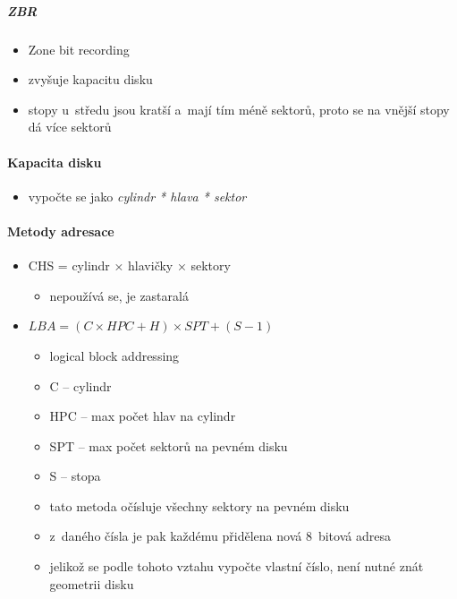 \documentclass[a4paper,12pt]{article}
\providecommand{\tightlist}{%
\setlength{\itemsep}{0pt}\setlength{\parskip}{0pt}}
\begin{document}
\subparagraph{ZBR}

\begin{itemize}
\tightlist
\item Zone bit recording
\item zvyšuje kapacitu disku
\item stopy u~středu jsou kratší a~mají tím méně sektorů, proto se na vnější
  stopy dá více sektorů
\end{itemize}

\paragraph{Kapacita disku}

\begin{itemize}
\tightlist
\item vypočte se jako \emph{cylindr * hlava * sektor}
\end{itemize}

\paragraph{Metody adresace}

\begin{itemize}
\tightlist
\item CHS = cylindr × hlavičky × sektory

  \begin{itemize}
  \tightlist
  \item nepoužívá se, je zastaralá
  \end{itemize}
\item $LBA = (C \times HPC + H) \times SPT + (S - 1)$

  \begin{itemize}
  \tightlist
  \item logical block addressing
  \item C -- cylindr
  \item HPC -- max počet hlav na cylindr
  \item SPT -- max počet sektorů na pevném disku
  \item S -- stopa
  \item tato metoda očísluje všechny sektory na pevném disku
  \item z~daného čísla je pak každému přidělena nová 8~bitová adresa
  \item jelikož se podle tohoto vztahu vypočte vlastní číslo, není nutné
    znát geometrii disku
  \end{itemize}
\end{itemize}
\end{document}
